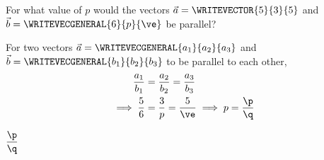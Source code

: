 


\FRACMULT\vd\va{}\ve\a
\FRACMULT\vd\va{}\p\q

\question[1] For what value of $p$ would the vectors $\vec{a} = \WRITEVECTOR{\va}{\vb}{\vc}$ and 
$\vec{b} = \WRITEVECGENERAL{\vd}{p}{\ve}$ be parallel?


\watchout

\ifprintanswers
\fi 

\begin{solution}[\mcq]
	For two vectors $\vec{a} = \WRITEVECGENERAL{a_1}{a_2}{a_3}$ and $\vec{b} = \WRITEVECGENERAL{b_1}{b_2}{b_3}$ 
	to be parallel to each other, 
	\begin{align}
		\dfrac{a_1}{b_1} &= \dfrac{a_2}{b_2} = \dfrac{a_3}{b_3} \\
		\implies \dfrac{\va}{\vd} &= \dfrac{\vb}{p} = \dfrac{\vc}{\ve} \implies p = \dfrac{\p}{\q}
	\end{align}
\end{solution}

\ifprintanswers\begin{codex}$\dfrac\p\q$\end{codex}\fi
